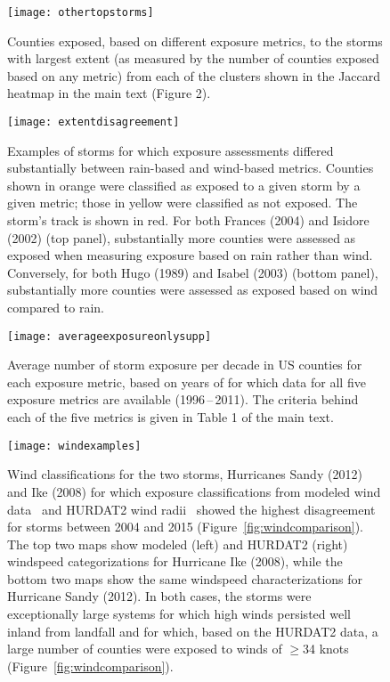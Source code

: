 \documentclass[11pt, titlepage, twoside]{article}
\begin{document}
\clearpage

\begin{figure}[tbhp!]
\centering
\texttt{[image: othertopstorms]}
\caption{Counties exposed, based on different exposure metrics, to the storms
with largest extent (as measured by the number of counties exposed based on any
metric) from each of the clusters shown in the Jaccard heatmap in the main text
(Figure 2).}
\label{fig:othertopstorms}
\end{figure}

\clearpage

\begin{figure}[tbhp!]
\centering
\texttt{[image: extentdisagreement]}
\caption{Examples of storms for which exposure assessments differed
substantially between rain-based and wind-based metrics. Counties shown in
orange were classified as exposed to a given storm by a given metric; those in
yellow were classified as not exposed. The storm's track is shown in red. For
both Frances (2004) and Isidore (2002) (top panel), substantially more counties
were assessed as exposed when measuring exposure based on rain rather than
wind. Conversely, for both Hugo (1989) and Isabel (2003) (bottom panel),
substantially more counties were assessed as exposed based on wind compared to
rain.}
\label{fig:extentdisagreement}
\end{figure}

\clearpage

\begin{figure}[tbhp!]
\centering
\texttt{[image: averageexposureonlysupp]}
\caption{Average number of storm exposure per decade in \ac{US} counties for
each exposure metric, based on years of for which data for all five exposure
metrics are available (1996\,--\,2011). The criteria behind each of the five
metrics is given in Table 1 of the main text.} \label{fig:averageexposuresupp}
\end{figure}

\clearpage 

\begin{figure}[tbhp!]
\centering
\texttt{[image: windexamples]}
\caption{Wind classifications for the two storms, Hurricanes Sandy (2012) and
Ike (2008) for which exposure classifications from modeled wind
data~\citep{stormwindmodel} and \ac{HURDAT2} wind
radii~\citep{demuth2006improvement} showed the highest disagreement for storms
between 2004 and 2015 (Figure~\ref{fig:windcomparison}). The top two maps show
modeled (left) and \ac{HURDAT2} (right) windspeed categorizations for Hurricane
Ike (2008), while the bottom two maps show the same windspeed characterizations
for Hurricane Sandy (2012).  In both cases, the storms were exceptionally large
systems for which high winds persisted well inland from landfall and for which,
based on the \ac{HURDAT2} data, a large number of counties were exposed to
winds of $\ge$34 knots (Figure~\ref{fig:windcomparison}).}
\label{fig:windexamples}
\end{figure}
\end{document}
